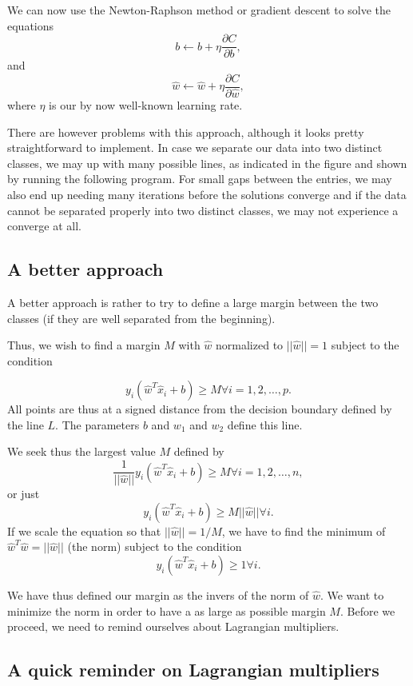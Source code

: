 \documentclass[%
oneside,                 %
final,                   %
10pt]{article}
\begin{document}
We can now use the Newton-Raphson method or gradient descent to solve the equations
\[
b \leftarrow b +\eta \frac{\partial C}{\partial b},
\]
and
\[
\hat{w} \leftarrow \hat{w} +\eta \frac{\partial C}{\partial \hat{w}},
\]
where $\eta$ is our by now well-known learning rate. 

There are however problems with this approach, although it looks
pretty straightforward to implement. In case we separate our data into
two distinct classes, we may up with many possible lines, as indicated
in the figure and shown by running the following program. For small
gaps between the entries, we may also end up needing many iterations
before the solutions converge and if the data cannot be separated
properly into two distinct classes, we may not experience a converge
at all.

\subsection*{A better approach}

A better approach is rather to try to define a large margin between
the two classes (if they are well separated from the beginning).

Thus, we wish to find a margin $M$ with $\hat{w}$ normalized to
$\vert\vert \hat{w}\vert\vert =1$ subject to the condition

\[
y_i(\hat{w}^T\hat{x}_i+b) \geq M \forall i=1,2,\dots, p. 
\]
All points are thus at a signed distance from the decision boundary defined by the line $L$. The parameters $b$ and $w_1$ and $w_2$ define this line. 

We seek thus the largest value $M$ defined by
\[
\frac{1}{\vert \vert \hat{w}\vert\vert}y_i(\hat{w}^T\hat{x}_i+b) \geq M \forall i=1,2,\dots, n, 
\]
or just 
\[
y_i(\hat{w}^T\hat{x}_i+b) \geq M\vert \vert \hat{w}\vert\vert \forall i. 
\]
If we scale the equation so that $\vert \vert \hat{w}\vert\vert = 1/M$, we have to find the minimum of 
$\hat{w}^T\hat{w}=\vert \vert \hat{w}\vert\vert$ (the norm) subject to the condition
\[
y_i(\hat{w}^T\hat{x}_i+b) \geq 1 \forall i.
\]

We have thus defined our margin as the invers of the norm of $\hat{w}$. We want to minimize the norm in order to have a as large as possible margin $M$. Before we proceed, we need to remind ourselves about Lagrangian multipliers. 

\subsection*{A quick reminder on Lagrangian multipliers}
\end{document}
